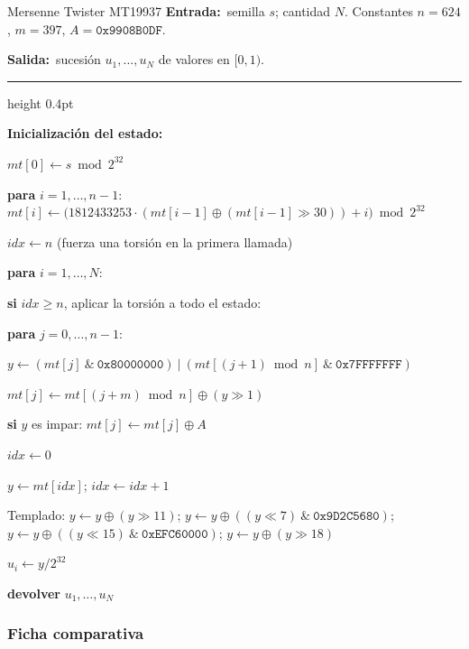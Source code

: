 \documentclass[11pt,letterpaper]{article}
\newcommand{\entrada}[1]{\textbf{\small Entrada:}\ \small #1\par}
\newcommand{\salida}[1]{\textbf{\small Salida:}\ \small #1\par
  \vspace{3pt}\textcolor{marco}{\hrule height 0.4pt}\vspace{5pt}}
\begin{document}
\begin{pseudo}{Mersenne Twister MT19937}
\entrada{semilla $s$; cantidad $N$. Constantes $n=624$, $m=397$,
$A = \texttt{0x9908B0DF}$.}
\salida{sucesión $u_1,\dots,u_N$ de valores en $[0,1)$.}
\begin{pasos}
  \item \textbf{Inicialización del estado:}
  \begin{pasos}
     \item $mt[0] \gets s \bmod 2^{32}$
     \item \textbf{para} $i = 1, \dots, n-1$:
       $mt[i] \gets \big(1812433253 \cdot (mt[i-1] \oplus (mt[i-1] \gg 30)) + i\big) \bmod 2^{32}$
     \item $\textit{idx} \gets n$ \quad \textcolor{gris}{\small(fuerza una torsión en la primera llamada)}
  \end{pasos}
  \item \textbf{para} $i = 1, \dots, N$:
  \begin{pasos}
     \item \textbf{si} $\textit{idx} \ge n$, aplicar la torsión a todo el estado:
     \begin{pasos}
        \item \textbf{para} $j = 0, \dots, n-1$:
        \item \quad $y \gets (mt[j]\ \&\ \texttt{0x80000000})\ |\ (mt[(j+1) \bmod n]\ \&\ \texttt{0x7FFFFFFF})$
        \item \quad $mt[j] \gets mt[(j+m) \bmod n] \oplus (y \gg 1)$
        \item \quad \textbf{si} $y$ es impar: $mt[j] \gets mt[j] \oplus A$
        \item $\textit{idx} \gets 0$
     \end{pasos}
     \item $y \gets mt[\textit{idx}]$; \quad $\textit{idx} \gets \textit{idx} + 1$
     \item Templado: $y \gets y \oplus (y \gg 11)$; \quad
           $y \gets y \oplus ((y \ll 7)\ \&\ \texttt{0x9D2C5680})$; \quad
           $y \gets y \oplus ((y \ll 15)\ \&\ \texttt{0xEFC60000})$; \quad
           $y \gets y \oplus (y \gg 18)$
     \item $u_i \gets y / 2^{32}$
  \end{pasos}
  \item \textbf{devolver} $u_1, \dots, u_N$
\end{pasos}
\end{pseudo}

\subsubsection{Ficha comparativa}
\end{document}
